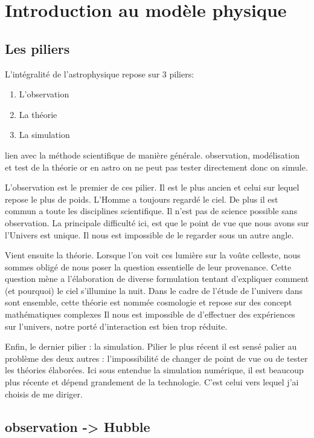 \chapter{Introduction au modèle physique }\label{ch:introduction_physique}

\section{Les piliers}

L'intégralité de l'astrophysique repose sur 3 piliers:
\begin{enumerate}
\item L'observation
\item La théorie
\item La simulation
\end{enumerate}

lien avec la méthode scientifique de manière générale. observation, modélisation et test de la théorie or en astro on ne peut pas tester directement donc on simule.

L'observation est le premier de ces pilier. 
Il est le plus ancien et celui sur lequel repose le plus de poids.
L'Homme a toujours regardé le ciel.
De plus il est commun a toute les disciplines scientifique.
Il n'est pas de science possible sans observation.
La principale difficulté ici, est que le point de vue que nous avons sur l'Univers est unique. 
Il nous est impossible de le regarder sous un autre angle.

Vient ensuite la théorie.
Lorsque l'on voit ces lumière sur la voûte celleste, nous sommes obligé de nous poser la question essentielle de leur provenance.
Cette question mène a l'élaboration de diverse formulation tentant d'expliquer comment (et pourquoi) le ciel s'illumine la nuit.  
Dans le cadre de l'étude de l'univers dans sont ensemble, cette théorie est nommée cosmologie et repose sur des concept mathématiques complexes
Il nous est impossible de d'effectuer des expériences sur l'univers, notre porté d'interaction est bien trop réduite.

Enfin, le dernier pilier : la simulation.
Pilier le plus récent il est sensé palier au problème des deux autres : l'impossibilité de changer de point de vue ou de tester les théories élaborées.
Ici sous entendue la simulation numérique, il est beaucoup plus récente et dépend grandement de la technologie.
C'est celui vers lequel j'ai choisis de me diriger.

\section{observation -> Hubble}

